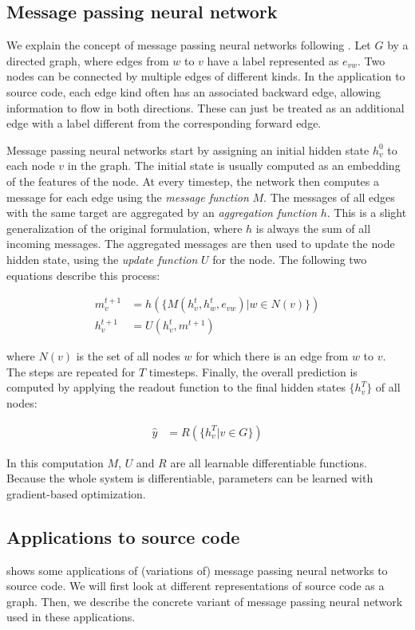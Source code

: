 \documentclass[sigconf,authordraft=true,nonacm=true]{acmart}
\begin{document}
\subsection{Message passing neural network}\label{sec:mpnn}
We explain the concept of message passing neural networks following \citet{gilmer_neural_2017}.
Let $G$ by a directed graph, where edges from $w$ to $v$ have a label represented as $e_{vw}$.
Two nodes can be connected by multiple edges of different kinds.
In the application to source code, each edge kind often has an associated backward edge, allowing information to flow in both directions.
These can just be treated as an additional edge with a label different from the corresponding forward edge.

Message passing neural networks start by assigning an initial hidden state $h^0_v$ to each node $v$ in the graph.
The initial state is usually computed as an embedding of the features of the node.
At every timestep, the network then computes a message for each edge using the \textit{message function} $M$.
The messages of all edges with the same target are aggregated by an \textit{aggregation function} $h$.
This is a slight generalization of the original formulation, where $h$ is always the sum of all incoming messages.
The aggregated messages are then used to update the node hidden state, using the \textit{update function} $U$ for the node.
The following two equations describe this process:

\begin{align}
  m^{t+1}_{v} & = h(\{M(h^{t}_{v},h^{t}_{w},e_{vw}) | w \in N(v)\}) \label{eq:msg} \\
  h^{t+1}_{v} & = U(h^{t}_{v}, m^{t+1}) \label{eq:update}
\end{align}

where $N(v)$ is the set of all nodes $w$ for which there is an edge from $w$ to $v$.
The steps are repeated for $T$ timesteps. Finally, the overall prediction is computed by applying the readout function to the final hidden states $\{h^{T}_{v}\}$ of all nodes:

\begin{align}
  \hat{y} &= R(\{h^{T}_{v} | v \in G\}) \label{eq:readout}
\end{align}

In this computation $M$, $U$ and $R$ are all learnable differentiable functions.
Because the whole system is differentiable, parameters can be learned with gradient-based optimization.

\subsection{Applications to source code}\label{sec:app}
 shows some applications of (variations of) message passing neural networks to source code.
We will first look at different representations of source code as a graph.
Then, we describe the concrete variant of message passing neural network used in these applications.
\end{document}
